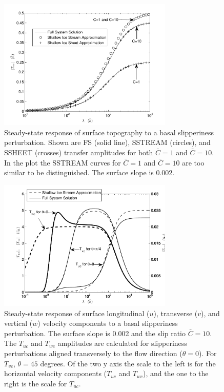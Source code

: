 \documentclass[10pt,a4paper]{book}
\newcommand{\T}{T}
\begin{document}
\begin{figure}
\vspace*{2mm}
\centerline{\includegraphics[width=8.3cm]{tc-2007-0016-f10.pdf}}
\caption{Steady-state response of surface topography
to a basal slipperiness perturbation.  Shown are FS (solid line),
SSTREAM (circles), and SSHEET (crosses) transfer amplitudes for both
$\bar{C}{=}1$ and $\bar{C}{=}10$. In the plot the SSTREAM curves for
$\bar{C}{=}1$ and $\bar{C}{=}10$ are too similar to be distinguished.  The
surface slope is 0.002.
\label{fig:Tsc}}
\end{figure}


\begin{figure}
\vspace*{2mm}
\centerline{\includegraphics[width=8.3cm]{tc-2007-0016-f11.pdf}}
\caption{Steady-state response of surface longitudinal
($u$), transverse ($v$), and vertical ($w$) velocity components to a
basal slipperiness perturbation. The surface slope is 0.002 and the
slip ratio $\bar{C}{=}10$.  The $\T_{uc}$ and $\T_{wc}$ amplitudes are
calculated for slipperiness perturbations aligned transversely to the
flow direction ($\theta{=}0$). For $\T_{vc}$, $\theta{=}45$ degrees.  Of
the two y axis the scale to the left is for the horizontal velocity
components ($\T_{uc}$ and $\T_{wc}$), and the one to the right is the
scale for $\T_{uc}$.
\label{fig:TucTvcC10}}
\end{figure}
\end{document}

